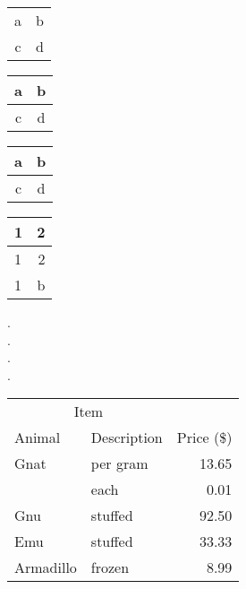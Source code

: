 \documentclass{article}
\begin{document}
\begin{tabular}{|c|c|}
a & b \\
c & d\\
\end{tabular}

\begin{tabular}{|c|c|}
\hline
a & b \\
\hline
c & d\\
\hline
\end{tabular}

\begin{center}
\begin{tabular}{|c|c|}
\hline
a & b \\ \hline
c & d\\
\hline
\end{tabular}
\end{center}



\begin{tabular}{lr}
\hline
1 & 2 \\
\hline
 1 & 2 \\
 1 & b \\
\hline
\end{tabular}

 .\\
 .\\
. \\
. \\
 
\begin{tabular}{@{}llr@{}} \toprule
\multicolumn{2}{c}{Item} \\ \cmidrule(r){1-2}
Animal & Description & Price (\$)\\ \midrule
Gnat & per gram & 13.65 \\
& each & 0.01 \\
Gnu & stuffed & 92.50 \\
Emu & stuffed & 33.33 \\
Armadillo & frozen & 8.99 \\ \bottomrule
\end{tabular}
\end{document}
